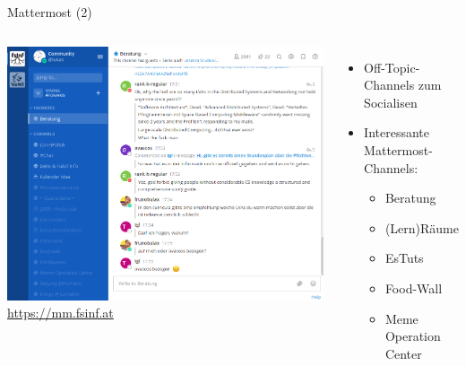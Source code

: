 \documentclass{beamer}
\begin{document}
\begin{frame}{Mattermost (2)}
  \begin{columns}
      \centering
      \includegraphics[width=\textwidth]{mattermost.png}
      \url{https://mm.fsinf.at}
      \begin{itemize}
        \item Off-Topic-Channels zum Socialisen
        \item Interessante Mattermost-Channels:
            \begin{itemize}
                \item Beratung
                \item (Lern)Räume
                \item EsTuts
                \item Food-Wall
                \item Meme Operation Center
            \end{itemize}
      \end{itemize}
  \end{columns}
\end{frame}
\end{document}
